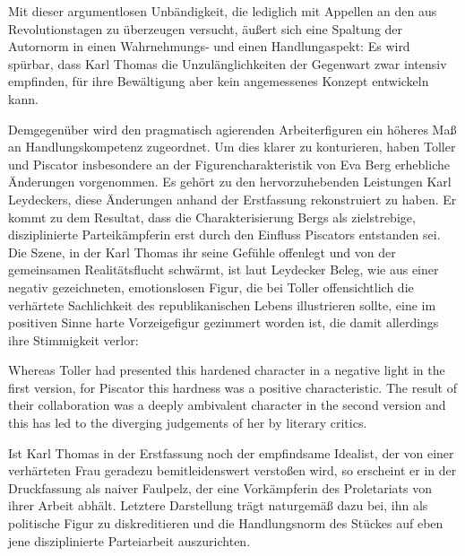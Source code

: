 Mit dieser argumentlosen Unbändigkeit, die lediglich mit Appellen an den
\Cite{Glauben}  aus Revolutionstagen zu überzeugen
versucht, äußert sich eine Spaltung der Autornorm in einen Wahrnehmungs- und
einen Handlungaspekt: Es wird spürbar, dass Karl Thomas die Unzulänglichkeiten der
Gegenwart zwar intensiv empfinden, für ihre Bewältigung aber kein angemessenes
Konzept entwickeln kann. 

Demgegenüber wird den pragmatisch agierenden Arbeiterfiguren ein höheres Maß
an Handlungskompetenz zugeordnet. Um dies klarer zu konturieren, haben Toller
und Piscator insbesondere an der Figurencharakteristik von Eva Berg erhebliche
Änderungen vorgenommen. Es gehört zu den hervorzuhebenden Leistungen Karl
Leydeckers, diese Änderungen anhand der Erstfassung rekonstruiert zu haben. 
Er kommt zu dem Resultat, dass die Charakterisierung Bergs als zielstrebige,
disziplinierte Parteikämpferin erst durch den Einfluss Piscators entstanden
sei. Die Szene, in der Karl Thomas ihr seine Gefühle offenlegt und von der
gemeinsamen Realitätsflucht schwärmt,  
ist laut Leydecker Beleg, wie aus einer negativ gezeichneten,
emotionslosen Figur, die bei Toller offensichtlich die verhärtete Sachlichkeit
des republikanischen Lebens illustrieren sollte, eine im positiven Sinne harte
Vorzeigefigur gezimmert worden ist, die damit allerdings ihre Stimmigkeit
verlor:
 
\begin{BlockQuote}
Whereas Toller had presented this hardened character in a negative light in
the first version, for Piscator this hardness was a positive
characteristic. The result of their collaboration was a deeply ambivalent
character in the second version and this has led to the diverging judgements
of her by literary critics.
\end{BlockQuote}
Ist Karl Thomas in der Erstfassung noch der empfindsame Idealist, der von
einer verhärteten Frau geradezu bemitleidenswert verstoßen wird, so erscheint
er in der Druckfassung als naiver Faulpelz, der eine Vorkämpferin des
Proletariats von ihrer Arbeit abhält. Letztere Darstellung trägt naturgemäß
dazu bei, ihn als politische Figur zu diskreditieren und die Handlungsnorm des
Stückes auf eben jene disziplinierte Parteiarbeit auszurichten.

